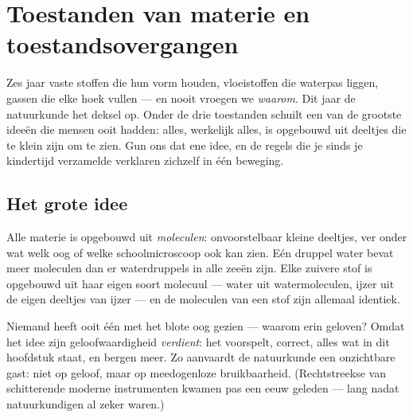 \chapter{Toestanden van materie en toestandsovergangen}\label{ch:g7:states-of-matter}

Zes jaar vaste stoffen die hun vorm houden, vloeistoffen die waterpas
liggen, gassen die elke hoek vullen --- en nooit vroegen we
\emph{waarom}. Dit jaar  de natuurkunde het deksel op. Onder de
drie toestanden schuilt een van de grootste ideeën die mensen ooit
hadden: alles, werkelijk alles, is opgebouwd uit deeltjes die te klein
zijn om te zien. Gun ons dat ene idee, en de regels die je sinds je
kindertijd verzamelde verklaren zichzelf in één beweging.

\section{Het grote idee}

\begin{definition}[Moleculen]\label{def:g7:states-of-matter:molecule}
Alle materie is opgebouwd uit \emph{moleculen}:
onvoorstelbaar kleine deeltjes, ver onder wat welk oog of welke
schoolmicroscoop ook kan zien. Eén druppel water bevat meer moleculen
dan er waterdruppels in alle zeeën zijn. Elke zuivere stof is
opgebouwd uit haar eigen soort molecuul --- water uit
watermoleculen, ijzer uit de eigen deeltjes van ijzer --- en de
moleculen van een stof zijn allemaal identiek.
\end{definition}

\begin{remark}\label{rem:g7:states-of-matter:believing}
Niemand heeft ooit één  met het blote oog gezien --- waarom
erin geloven? Omdat het idee zijn geloofwaardigheid \emph{verdient}:
het voorspelt, correct, alles wat in dit hoofdstuk staat, en bergen
meer. Zo aanvaardt de natuurkunde een onzichtbare gast: niet op geloof,
maar op meedogenloze bruikbaarheid. (Rechtstreekse  van
schitterende moderne instrumenten kwamen pas een eeuw geleden --- lang
nadat natuurkundigen al zeker waren.)
\end{remark}


